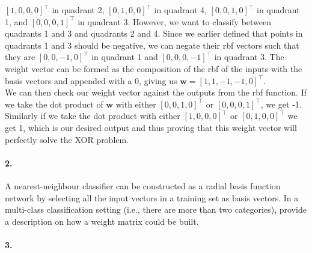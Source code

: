 \documentclass{article}
\newcommand{\vect}[1]{\mathbf{#1}}
\newcommand{\vw}[0]{\vect{w}}
\begin{document}
$[1, 0, 0, 0]^\top$ in quadrant 2, $[0, 1, 0, 0]^\top$ in quadrant 4, $[0, 0, 1, 0]^\top$ in quadrant 1, and $[0, 0, 0, 1]^\top$ in quadrant 3. However, we want to classify between quadrants 1 and 3 and quadrants 2 and 4. Since we earlier defined that points in quadrants 1 and 3 should be negative, we can negate their rbf vectors such that they are $[0, 0, -1, 0]^\top$ in quadrant 1 and $[0, 0, 0, -1]^\top$ in quadrant 3. The weight vector can be formed as the composition of the rbf of the inputs with the basis vectors and appended with a 0, giving us $\vw = \left[ 1, 1, -1, -1, 0 \right]^\top$. \\
We can then check our weight vector against the outputs from the rbf function. If we take the dot product of $\vw$ with either $[0, 0, 1, 0]^\top$ or $[0, 0, 0, 1]^\top$, we get -1. Similarly if we take the dot product with either $[1, 0, 0, 0]^\top$ or $[0, 1, 0, 0]^\top$ we get 1, which is our desired output and thus proving that this weight vector will perfectly solve the XOR problem.


\vspace{30mm}

\paragraph{2.}

A nearest-neighbour classifier can be constructed as a radial basis
function network by selecting all the input vectors in a training set as basis
vectors. In a multi-class classification setting (i.e., there are more than two
categories), provide a description on how a weight matrix could be built.

\vspace{30mm}

\paragraph{3.} 
\end{document}
